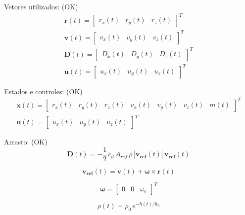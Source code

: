 \documentclass[10pt,a4paper]{article}
\begin{document}
	Vetores utilizados: (OK)
	\begin{equation}
		\begin{gathered}
			\mathbf{r}(t) = \begin{bmatrix} r_x(t) & r_y(t) & r_z(t) \end{bmatrix}^T \\
			\mathbf{v}(t) = \begin{bmatrix} v_x(t) & v_y(t) & v_z(t) \end{bmatrix}^T \\
			\mathbf{D}(t) = \begin{bmatrix} D_x(t) & D_y(t) & D_z(t) \end{bmatrix}^T \\
			\mathbf{u}(t) = \begin{bmatrix} u_x(t) & u_y(t) & u_z(t) \end{bmatrix}^T 
		\end{gathered}
	\end{equation}
	
	Estados e controles: (OK)
	\begin{equation}
		\begin{gathered}
			\mathbf{x}(t) = \begin{bmatrix} r_x(t) & r_y(t) & r_z(t) & v_x(t) & v_y(t) & v_z(t) & m(t) \end{bmatrix}^T \\ 
			\mathbf{u}(t) = \begin{bmatrix} u_x(t) & u_y(t) & u_z(t) \end{bmatrix}^T
		\end{gathered}
	\end{equation}
	
	Arrasto: (OK)
	\begin{equation}
		\mathbf{D}(t) = -\frac{1}{2} \, c_d \, A_{ref} \, \rho \, |\mathbf{v_{ref}}(t)| \, \mathbf{v_{ref}}(t)
	\end{equation}
	
	\begin{equation}
		\mathbf{v_{ref}}(t) = \mathbf{v}(t) + {\bm \omega} \times \mathbf{r}(t)
	\end{equation}
	
	\begin{equation}
		{\bm \omega} = \begin{bmatrix} 0 & 0 & \omega_e \end{bmatrix}^T
	\end{equation}
	
	\begin{equation}
		\rho(t) = \rho_0 \, e^{-h(t)/h_0}
	\end{equation}
	
\end{document}
